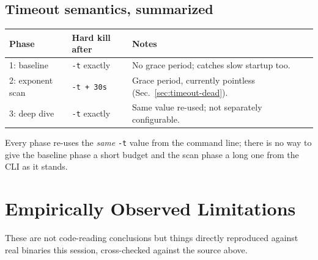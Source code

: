 \documentclass[11pt]{article}
\begin{document}
\subsection{Timeout semantics, summarized}

\begin{center}
\begin{tabular}{lll}
\toprule
Phase & Hard kill after & Notes \\
\midrule
1: baseline & \texttt{-t} exactly & No grace period; catches slow startup too. \\
2: exponent scan & \texttt{-t + 30s} & Grace period, currently pointless (Sec.~\ref{sec:timeout-dead}). \\
3: deep dive & \texttt{-t} exactly & Same value re-used; not separately configurable. \\
\bottomrule
\end{tabular}
\end{center}

Every phase re-uses the \emph{same} \texttt{-t} value from the command
line; there is no way to give the baseline phase a short budget and the
scan phase a long one from the CLI as it stands.

\section{Empirically Observed Limitations}
\label{sec:limitations}

These are not code-reading conclusions but things directly reproduced
against real binaries this session, cross-checked against the source
above.
\end{document}
